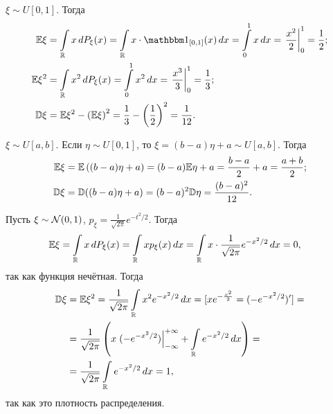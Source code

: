 \documentclass[../main.tex]{subfiles}
\begin{document}
\begin{exmpl}
 $ \xi \sim U[0,1] $. Тогда
 \begin{align*}
  \E\xi &= \int\limits_{\R} x\,dP_\xi(x)  = \int\limits_{\R} x \cdot \Ind_{[0,1]}  (x)\,dx= \int\limits_{0}^{1} x\,dx = \left. \frac{x^{2}}{2} \right|_0^{1} = \frac{1}{2}; \\
   \E\xi^{2} &= \int\limits_{\R} x^2\,dP_\xi(x) = \int\limits_{0}^{1} x^{2}\,dx = \left. \frac{x^{3}}{3}\right|_0^{1} = \frac{1}{3}; \\
    \D\xi &=\E\xi^{2} - \left( \E\xi \right)^{2} = \frac{1}{3} - \left(\frac{1}{2}\right)^2 = \frac{1}{12}.
   \end{align*} 
  \end{exmpl}
  \begin{exmpl}
   $ \xi \sim U[a,b] $. Если $ \eta \sim U[0,1] $, то $ \xi = (b-a)\eta + a\sim U[a,b] $. Тогда
   \begin{align*}
    \mathbb E\xi &= \mathbb E \left( (b-a)\eta + a \right) = (b-a)\mathbb E\eta + a = \frac{b-a}{2} + a = \frac{a+b}{2}; \\
    \mathbb D\xi &= \mathbb D((b-a)\eta + a) = (b-a)^{2}\mathbb D\eta = \frac{(b-a)^{2}}{12}.
   \end{align*} 
  \end{exmpl}

  \begin{exmpl}
   Пусть $ \xi \sim \mathcal N(0,1) $,  $ p_\xi = \frac{1}{\sqrt{2\pi}}e^{-t^{2} / 2} $. Тогда
   \begin{align*}
    \mathbb E\xi &= \int\limits_{\mathbb{R}} x\,dP_\xi(x) = \int\limits_{\mathbb{R}} x p_\xi(x)\,dx = \int\limits_{\mathbb{R}} x \cdot \frac{1}{\sqrt{2\pi}}      e^{-x^{2} / 2}\,dx = 0,
   \end{align*} так как функция нечётная. Тогда
   \begin{align*}
    \mathbb D\xi &= \mathbb E\xi^{2} = \frac{1}{\sqrt{2\pi}}\int\limits_{\mathbb{R}} x^{2} e^{-x^{2} / 2}\,dx = [xe^{-\frac{x^2}{2}} = (-e^{-x^{2} / 2})'] = \\
    &= \frac{1}{\sqrt{2\pi}} \left( x \left.(-e^{-x^{2} / 2})\right|_{-\infty}^{+\infty} + \int\limits_{\mathbb{R}} e^{-x^{2} / 2}\,dx  \right) = \\
     &= \frac{1}{\sqrt{2\pi}} \int\limits_{\mathbb{R}} e^{-x^{2} / 2} \,dx = 1,
    \end{align*} так как это плотность распределения.
   \end{exmpl}
\end{document}
